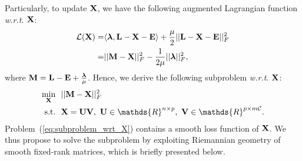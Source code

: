 \documentclass[letterpaper]{article}
\def\bM{{\bf M}}
\def\bE{{\bf E}}
\def\blambda{{\bm \lambda}}
\def\calL{{\mathcal{L}}}
\def\calC{{\mathcal{C}}}
\def\bL{{\bf L}}
\def\bU{{\bf U}}
\def\bV{{\bf V}}
\def\dsR{\mathds{R}}
\def\bX{{\bf X}}
\def\bX{{\bf X}}
\def\st{{\text{s.t.}}}
\def\wrt{\emph{w.r.t}}
\begin{document}
Particularly, to update $\bX$, we have the following augmented Lagrangian function \wrt. $\bX$:
\begin{align}\label{eq:langrangian_wrt_X}
  \calL (\bX) = & \langle \blambda, \bL - \bX - \bE \rangle + \frac{\mu}{2} || \bL - \bX - \bE ||_F^2  \nonumber  \\
              = & || \bM - \bX ||_F^2 - \frac{1}{2\mu}|| \blambda ||_F^2   ,
\end{align}
\noindent
where $\bM = \bL - \bE + \frac{\blambda}{\mu}$.
Hence, we derive the following subproblem \wrt. $\bX$:
\begin{align}\label{eq:subproblem_wrt_X}
  \min_{\bX} ~&~ || \bM - \bX ||_F^2    \nonumber \\
  \st        ~&~ \bX = \bU \bV,~\bU \in \dsR^{n \times p},~\bV \in \dsR^{p \times m\calC}   .
\end{align}
Problem~(\ref{eq:subproblem_wrt_X}) contains a smooth loss function of $\bX$.
We thus propose to solve the subproblem by exploiting Riemannian geometry of smooth fixed-rank matrices, which is briefly presented below.
\end{document}
